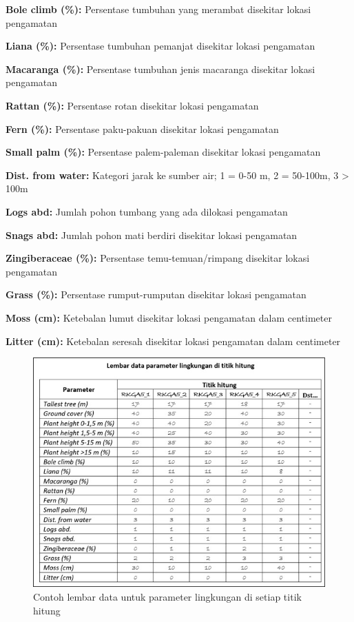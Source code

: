 \documentclass[
]{book}
\begin{document}
\textbf{Bole climb (\%):} Persentase tumbuhan yang merambat disekitar lokasi pengamatan

\textbf{Liana (\%):} Persentase tumbuhan pemanjat disekitar lokasi pengamatan

\textbf{Macaranga (\%):} Persentase tumbuhan jenis macaranga disekitar lokasi pengamatan

\textbf{Rattan (\%):} Persentase rotan disekitar lokasi pengamatan

\textbf{Fern (\%):} Persentase paku-pakuan disekitar lokasi pengamatan

\textbf{Small palm (\%):} Persentase palem-paleman disekitar lokasi pengamatan

\textbf{Dist. from water:} Kategori jarak ke sumber air; 1 = 0-50 m, 2 = 50-100m, 3 \textgreater{} 100m

\textbf{Logs abd:} Jumlah pohon tumbang yang ada dilokasi pengamatan

\textbf{Snags abd:} Jumlah pohon mati berdiri disekitar lokasi pengamatan

\textbf{Zingiberaceae (\%):} Persentase temu-temuan/rimpang disekitar lokasi pengamatan

\textbf{Grass (\%):} Persentase rumput-rumputan disekitar lokasi pengamatan

\textbf{Moss (cm):} Ketebalan lumut disekitar lokasi pengamatan dalam centimeter

\textbf{Litter (cm):} Ketebalan seresah disekitar lokasi pengamatan dalam centimeter

\begin{figure}

{\centering \includegraphics[width=0.75\linewidth]{images/ldp_pl} 

}

\caption{Contoh lembar data untuk parameter lingkungan di setiap titik hitung}\label{fig:ldppl}
\end{figure}
\end{document}
